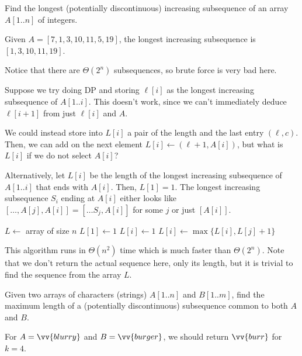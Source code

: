 \begin{problem}
  Find the longest (potentially discontinuous)
  increasing subsequence of an array $A[1..n]$ of integers.
\end{problem}
\begin{example}
  Given $A = [7,1,3,10,11,5,19]$, the longest increasing subsequence is
  $[1,3,10,11,19]$.
\end{example}

Notice that there are $\Theta(2^n)$ subsequences, so brute force is very bad here.

Suppose we try doing DP and storing $\ell[i]$ as the longest increasing subsequence of $A[1..i]$.
This doesn't work, since we can't immediately deduce $\ell[i+1]$ from just $\ell[i]$ and $A$.

We could instead store into $L[i]$ a pair of the length and the last entry $(\ell, c)$.
Then, we can add on the next element $L[i] \gets (\ell + 1, A[i])$,
but what is $L[i]$ if we do not select $A[i]$?

Alternatively, let $L[i]$ be the length of the longest increasing subsequence
of $A[1..i]$ that ends with $A[i]$. Then, $L[1] = 1$.
The longest increasing subsequence $S_i$ ending at $A[i]$
either looks like $[\dotsc,A[j],A[i]] = [\dots S_j, A[i]]$ for some $j$
or just $[A[i]]$.

\begin{algorithm}[H]
  \caption{}
  \begin{algorithmic}[1]
    \State $L \gets$ array of size $n$
    \State $L[1] \gets 1$
      \State $L[i] \gets 1$ 
       
          \State $L[i] \gets \max\{L[i], L[j] + 1\}$
        \EndIf
      \EndFor
    \EndFor
    \State {}
  \end{algorithmic}
\end{algorithm}

This algorithm runs in $\Theta(n^2)$ time which is much faster than $\Theta(2^n)$.
Note that we don't return the actual sequence here, only its length,
but it is trivial to find the sequence from the array $L$.

\begin{problem}
  Given two arrays of characters (strings) $A[1..n]$ and $B[1..m]$,
  find the maximum length of a (potentially discontinuous) subsequence
  common to both $A$ and $B$.
\end{problem}
\begin{example}
  For $A = \vv{blurry}$ and $B = \vv{burger}$, we should return $\vv{burr}$ for $k=4$.
\end{example}

